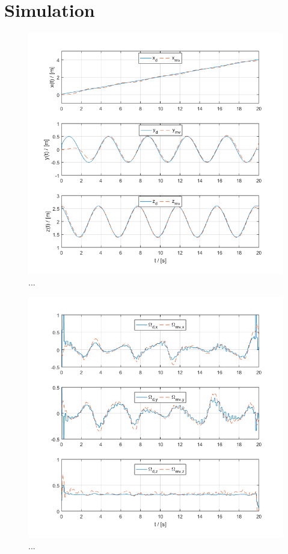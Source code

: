 \section{Simulation}


\begin{figure}[h!]
	\centering
	\includegraphics[width=\columnwidth]{./pictures/mmc_traj_pos.png}
	\caption{...}
	\label{fig:traj_pos}
\end{figure}

\begin{figure}[h!]
	\centering
	\includegraphics[width=\columnwidth]{./pictures/mmc_traj_omega.png}
	\caption{...}
	\label{fig:traj_omega}
\end{figure}

